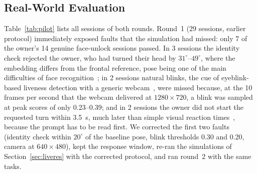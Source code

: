 \documentclass{ieeeaccess}
\begin{document}
\subsection{Real-World Evaluation}\label{sec:pilot}
Table~\ref{tab:pilot} lists all sessions of both rounds. Round~1 (29 sessions, earlier protocol) immediately exposed faults that the simulation had missed: only 7 of the owner's 14 genuine face-unlock sessions passed. In 3 sessions the identity check rejected the owner, who had turned their head by $31^\circ$--$49^\circ$, where the embedding differs from the frontal reference, pose being one of the main difficulties of face recognition~\cite{gupta2024ensemble}; in 2 sessions natural blinks, the cue of eyeblink-based liveness detection with a generic webcam~\cite{pan2007eyeblink}, were missed because, at the 10 frames per second that the webcam delivered at $1280\times720$, a blink was sampled at peak scores of only 0.23--0.39; and in 2 sessions the owner did not start the requested turn within 3.5~s, much later than simple visual reaction times~\cite{tatsuno2016reaction}, because the prompt has to be read first. We corrected the first two faults (identity check within $20^\circ$ of the baseline pose, blink thresholds 0.30 and 0.20, camera at $640\times480$), kept the response window, re-ran the simulations of Section~\ref{sec:liveres} with the corrected protocol, and ran round~2 with the same tasks.
\end{document}
